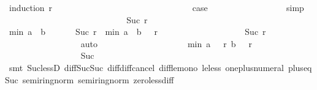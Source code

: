 \begin{isabellebody}
\ {\isacharparenleft}induction\ r{\isacharparenright}\isanewline
\ \ \ \ \ \ \ \ \ \ \ \ \ \ \isamarkupfalse%
\ {}\isanewline
\ \ \ \ \ \ \ \ \ \ \ \ \ \ \isamarkupfalse%
\ {\isacharquery}case\isanewline
\ \ \ \ \ \ \ \ \ \ \ \ \ \ \ \ \isamarkupfalse%
\ simp\isanewline
\ \ \ \ \ \ \ \ \ \ \ \ \isamarkupfalse%
\isanewline
\ \ \ \ \ \ \ \ \ \ \ \ \ \ \isamarkupfalse%
\ {\isacharparenleft}Suc\ r{\isacharparenright}\isanewline
\ \ \ \ \ \ \ \ \ \ \ \ \ \ \isamarkupfalse%
\ {\isachardoublequoteopen}min\ {\isacharparenleft}a\ {}{}{}{}{\isacharparenright}\ {\isacharparenleft}b\ {}{}{}{}{\isacharparenright}\ {\isacharminus}\ {\isacharparenleft}{}{}{}{}\ {\isacharminus}\ {\isacharparenleft}{}{}{}{}\ {\isacharminus}\ Suc\ r{\isacharparenright}{\isacharparenright}\ {\isacharequal}\ min\ {\isacharparenleft}a\ {}{}{}{}{\isacharparenright}\ {\isacharparenleft}b\ {}{}{}{}{\isacharparenright}\ {\isacharminus}\ r\ {\isacharminus}\ {}{\isachardoublequoteclose}\isanewline
\ \ \ \ \ \ \ \ \ \ \ \ \ \ \ \ \isamarkupfalse%
\ {\isacharbackquoteopen}Suc\ r\ {\isacharless}\ {}{}{}{}{\isacharbackquoteclose}\isanewline
\ \ \ \ \ \ \ \ \ \ \ \ \ \ \ \ \isamarkupfalse%
\ auto\isanewline
\ \ \ \ \ \ \ \ \ \ \ \ \ \ \isamarkupfalse%
\ \isamarkupfalse%
\ {\isachardoublequoteopen}{\isachardot}{\isachardot}{\isachardot}\ {\isasymle}\ \ min\ {\isacharparenleft}a\ {\isacharparenleft}{}{}{}{}\ {\isacharminus}\ r{\isacharparenright}{\isacharparenright}\ {\isacharparenleft}b\ {\isacharparenleft}{}{}{}{}\ {\isacharminus}\ r{\isacharparenright}{\isacharparenright}\ {\isacharminus}\ {}{\isachardoublequoteclose}\isanewline
\ \ \ \ \ \ \ \ \ \ \ \ \ \ \ \ \isamarkupfalse%
\ Suc\isanewline
\ \ \ \ \ \ \ \ \ \ \ \ \ \ \ \ \isamarkupfalse%
\ {\isacharparenleft}smt\ Suc{\isacharunderscore}lessD\ diff{\isacharunderscore}Suc{\isacharunderscore}Suc\ diff{\isacharunderscore}diff{\isacharunderscore}cancel\ diff{\isacharunderscore}le{\isacharunderscore}mono\ le{\isacharunderscore}less\ one{\isacharunderscore}plus{\isacharunderscore}numeral\ plus{\isacharunderscore}{}{\isacharunderscore}eq{\isacharunderscore}Suc\ semiring{\isacharunderscore}norm{\isacharparenleft}{}{\isacharparenright}\ semiring{\isacharunderscore}norm{\isacharparenleft}{}{\isacharparenright}\ zero{\isacharunderscore}less{\isacharunderscore}diff{\isacharparenright}\isanewline

\end{isabellebody}
